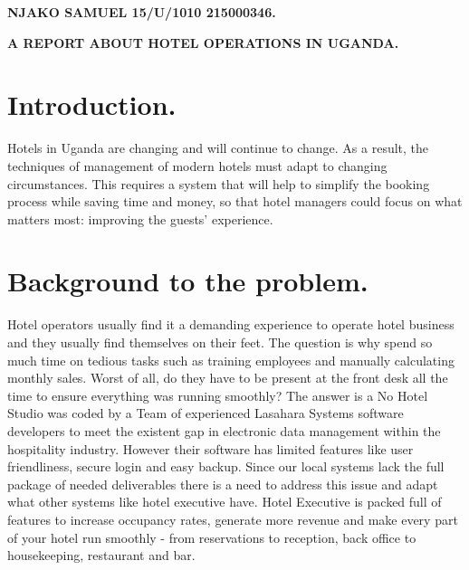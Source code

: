 \documentclass{article}
\begin{document}
\begin{small}\center   \textbf{               NJAKO SAMUEL             15/U/1010              215000346.}\end{small}

\begin{large}\textbf{A REPORT ABOUT HOTEL OPERATIONS IN UGANDA.}\end{large}

\section{Introduction.}
{Hotels in Uganda are changing and will continue to change. As a result, the techniques of
management of modern hotels must adapt to changing circumstances. This requires a system that will help to simplify the booking process while saving time and money, so that hotel managers could focus on what matters most: improving the guests’ experience. 
}
\section{Background to the problem.}
{Hotel operators usually find it a demanding experience to operate hotel business and they usually find themselves on their feet. The question is why spend so much time on tedious tasks such as training employees and manually calculating monthly sales. Worst of all, do they have to be present at the front desk all the time to ensure everything was running smoothly? The answer is a No
Hotel Studio was coded by a Team of experienced Lasahara Systems software developers to meet the existent gap in electronic data management within the hospitality industry. However their software has limited features like user friendliness, secure login and easy backup. Since our local systems lack the full package of needed deliverables there is a need to address this issue and adapt what other systems like hotel executive have. Hotel Executive is packed full of features to increase occupancy rates, generate more revenue and make every part of your hotel run smoothly - from reservations to reception, back office to housekeeping, restaurant and bar.
}
\end{document}
